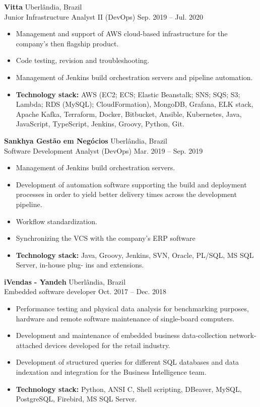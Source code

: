 \documentclass[12pt]{article}
\newcommand{\entry}[4]{{{\textbf{#1}}} \hfill #3 \\ #2 \hfill #4}
\begin{document}
\begin{paracol}{2}
\medskip

\entry{Vitta}{Junior Infrastructure Analyst II (DevOps)}{Uberlândia, Brazil}{Sep. 2019 -- Jul. 2020}
\begin{itemize}[noitemsep,leftmargin=3.5mm,rightmargin=0mm,topsep=6pt]
  \item Management and support of AWS cloud-based infrastructure for the company’s then flagship product.
  \item Code testing, revision and troubleshooting.
  \item Management of Jenkins build orchestration servers and pipeline automation.
  \item \textbf{Technology stack:} AWS (EC2; ECS; Elastic Beanstalk; SNS; SQS; S3;
  Lambda; RDS (MySQL); CloudFormation), MongoDB, Grafana, ELK stack, Apache Kafka,
  Terraform, Docker, Bitbucket, Ansible, Kubernetes, Java, JavaScript, TypeScript,
  Jenkins, Groovy, Python, Git.
\end{itemize}

\medskip

\entry{Sankhya Gestão em Negócios}{Software Development Analyst (DevOps)}{Uberlândia, Brazil}{Mar. 2019 -- Sep. 2019}
\begin{itemize}[noitemsep,leftmargin=3.5mm,rightmargin=0mm,topsep=6pt]
  \item Management of Jenkins build orchestration servers.
  \item Development of automation software supporting the build and
  deployment processes in order to yield better delivery times across
  the development pipeline.
  \item Workflow standardization.
  \item Synchronizing the VCS with the company’s ERP software
  \item \textbf{Technology stack:} Java, Groovy, Jenkins, SVN, Oracle, PL/SQL, MS SQL Server, in-house plug-
  ins and extensions.
\end{itemize}

\medskip

\entry{iVendas - Yandeh}{Embedded software developer}{Uberlândia, Brazil}{Oct. 2017 -- Dec. 2018}
\begin{itemize}[noitemsep,leftmargin=3.5mm,rightmargin=0mm,topsep=6pt]
  \item Performance testing and physical data analysis for benchmarking purposes, hardware and
  remote software maintenance of single-board computers.
  \item Development and maintenance of embedded business data-collection network-attached devices
  developed for the retail industry.
  \item Development of structured queries for different SQL databases and data indexation and
  integration for the Business Intelligence team.
  \item \textbf{Technology stack:} Python, ANSI C, Shell scripting, DBeaver, MySQL, PostgreSQL,
  Firebird, MS SQL Server.
\end{itemize}


\end{paracol}
\end{document}
